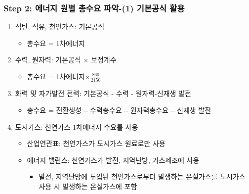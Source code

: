 \documentclass[10pt,compress,slidetop,%
			   hyperref={unicode},xcolor={svgnames},%
			   t]{beamer}
\begin{document}
\begin{frame}
	\frametitle{Step 2: 에너지 원별 총수요 파악-(1) 기본공식 활용}
\begin{enumerate}
\item{석탄, 석유, 천연가스: 기본공식}
\begin{itemize}
\item{총수요 = 1차에너지}
\end{itemize}
\smallskip

\item{수력, 원자력: 기본공식 $\times$ 보정계수}
\begin{itemize}
\item{총수요 = 1차에너지$\times\frac{860}{2150}$}
\end{itemize}
\smallskip

\item{화력 및 자가발전 전력: 기본공식 - 수력 - 원자력-신재생 발전}
\begin{itemize}
\item{총수요 = $\mbox{전환생성}-\mbox{수력총수요}-\mbox{원자력총수요}-\mbox{신재생 발전}$}
\end{itemize}
\smallskip

\item{도시가스: 천연가스 1차에너지 수요를 사용}
\begin{itemize}
\item{산업연관표: 천연가스가 도시가스 원료로만 사용}
\item{에너지 밸런스: 천연가스가 발전, 지역난방, 가스제조에 사용 }
\begin{itemize}
\item{발전, 지역난방에 투입된 천연가스로부터 발생하는 온실가스를 도시가스 사용 시 발생하는 온실가스에 포함}
\end{itemize}
\end{itemize}

\end{enumerate} 	
\end{frame}
% 
%
\end{document}
